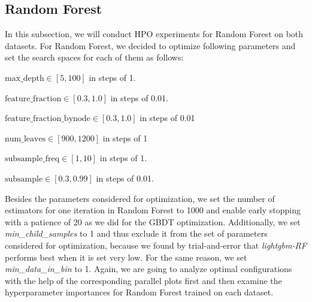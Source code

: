 \subsection{Random Forest}
In this subsection, we will conduct HPO experiments for Random Forest on both datasets. 
For Random Forest, we decided to optimize following parameters and set the search spaces for each of them as follows:
\begin{description}[font=$\bullet$\scshape\bfseries]
	\item $ \text{max\_depth} \in [5, 100] $ in steps of 1.
	\item $ \text{feature\_fraction} \in [0.3, 1.0] $ in steps of 0.01.
	\item $ \text{feature\_fraction\_bynode} \in [0.3, 1.0] $ in steps of 0.01
	\item $ \text{num\_leaves} \in [900, 1200] $ in steps of 1
	\item $ \text{subsample\_freq} \in [1, 10] $ in steps of 1.
	\item $ \text{subsample} \in [0.3, 0.99] $ in steps of 0.01.
\end{description}
Besides the parameters considered for optimization, we set the number of estimators for one iteration in Random Forest to 1000 and enable early stopping with a patience of 20 as we did for the GBDT optimization. Additionally, we set \textit{min\_child\_samples} to 1 and thus exclude it from the set of parameters considered for optimization, because we found by trial-and-error that \textit{lightgbm-RF} performs best when it is set very low. For the same reason, we set \textit{min\_data\_in\_bin} to 1. Again, we are going to analyze optimal configurations with the help of the corresponding parallel plots first and then examine the hyperparameter importances for Random Forest trained on each dataset. 


